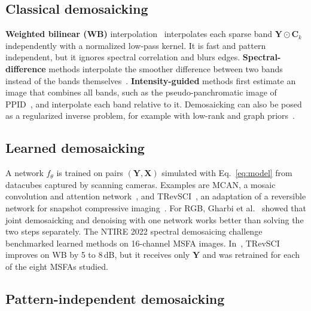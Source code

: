\documentclass{article}
\def\X{{\mathbf X}}
\def\Y{{\mathbf Y}}
\def\C{{\mathbf C}}
\begin{document}
\subsection{Classical demosaicking}

\textbf{Weighted bilinear (WB)} interpolation~\cite{brauers2006}
interpolates each sparse band $\Y\odot\C_k$ independently with a normalized
low-pass kernel. It is fast and pattern independent, but it ignores spectral
correlation and blurs edges. \textbf{Spectral-difference} methods interpolate
the smoother difference between two bands instead of the bands
themselves~\cite{brauers2006,mizutani2014}. \textbf{Intensity-guided}
methods first estimate an image that combines all bands, such as the
pseudo-panchromatic image of PPID~\cite{mihoubi2017}, and interpolate each
band relative to it. Demosaicking can also be posed as a regularized inverse
problem, for example with low-rank and graph priors~\cite{tsagkatakis2019}.

\subsection{Learned demosaicking}

A network $f_\theta$ is trained on pairs $(\Y,\X)$ simulated with
Eq.~\eqref{eq:model} from datacubes captured by scanning cameras. Examples
are MCAN, a mosaic convolution and attention network~\cite{feng2021}, and
TRevSCI~\cite{diaz2023}, an adaptation of a reversible network for snapshot
compressive imaging~\cite{cheng2021}. For RGB, Gharbi et
al.~\cite{gharbi2016} showed that joint demosaicking and denoising with one
network works better than solving the two steps separately. The NTIRE 2022
spectral demosaicing challenge~\cite{arad2022demosaic} benchmarked learned
methods on 16-channel MSFA images. In~\cite{diaz2023}, TRevSCI improves on
WB by 5 to 8\,dB, but it receives only $\Y$ and was retrained for each
of the eight MSFAs studied.

\subsection{Pattern-independent demosaicking}
\end{document}
